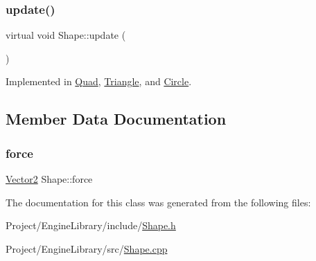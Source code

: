 \mbox{\label{class_shape_a303c47b13b9339dc021e040bbba72651}} 
\subsubsection{\texorpdfstring{update()}{update()}}
{\footnotesize\ttfamily virtual void Shape\+::update (\begin{DoxyParamCaption}{ }\end{DoxyParamCaption})\hspace{0.3cm}{\ttfamily [pure virtual]}}



Implemented in \mbox{\hyperlink{class_quad_a5e8eed8827894a4cf680b827a90d9d28}{Quad}}, \mbox{\hyperlink{class_triangle_a7fbd07ca45c992b433e193f442993e54}{Triangle}}, and \mbox{\hyperlink{class_circle_aa978eeba0712d29dfae842733bf6c2c7}{Circle}}.



\subsection{Member Data Documentation}
\mbox{\label{class_shape_a6047166afe804fa01ab78362b438bbef}} 
\subsubsection{\texorpdfstring{force}{force}}
{\footnotesize\ttfamily \mbox{\hyperlink{struct_vector2}{Vector2}} Shape\+::force}



The documentation for this class was generated from the following files\+:\begin{DoxyCompactItemize}
\item 
Project/\+Engine\+Library/include/\mbox{\hyperlink{_shape_8h}{Shape.\+h}}\item 
Project/\+Engine\+Library/src/\mbox{\hyperlink{_shape_8cpp}{Shape.\+cpp}}\end{DoxyCompactItemize}
